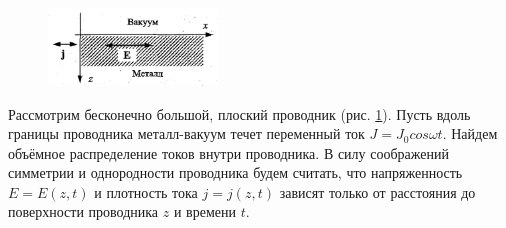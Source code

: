 \begin{figure}
	\vspace{-10pt}
	\centering
	\includegraphics[width=0.4\textwidth]{../res/metal.png}
	\caption{}
	\label{fig:metal}
\end{figure}

Рассмотрим бесконечно большой, плоский проводник (рис. \ref{fig:metal}). Пусть вдоль границы проводника металл-вакуум течет переменный ток $J = J_0 cos \omega t$. Найдем объёмное распределение токов внутри проводника. В силу соображений симметрии и однородности проводника будем считать, что напряженность $E = E(z, t)$ и плотность тока $j = j(z, t)$ зависят только от расстояния до поверхности проводника $z$ и времени $t$.

